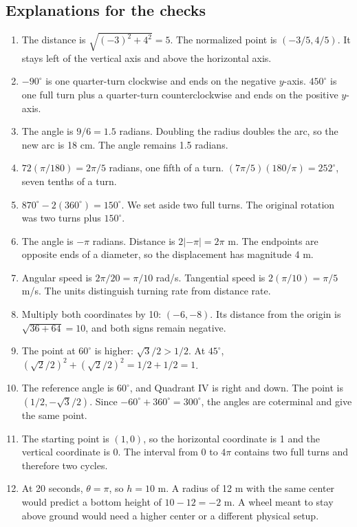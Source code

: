 \subsection{Explanations for the checks}
\begin{enumerate}
\item The distance is \(\sqrt{(-3)^2+4^2}=5\). The normalized point is \((-3/5,4/5)\). It stays left of the vertical axis and above the horizontal axis.
\item \(-90^\circ\) is one quarter-turn clockwise and ends on the negative \(y\)-axis. \(450^\circ\) is one full turn plus a quarter-turn counterclockwise and ends on the positive \(y\)-axis.
\item The angle is \(9/6=1.5\) radians. Doubling the radius doubles the arc, so the new arc is 18 cm. The angle remains 1.5 radians.
\item \(72(\pi/180)=2\pi/5\) radians, one fifth of a turn. \((7\pi/5)(180/\pi)=252^\circ\), seven tenths of a turn.
\item \(870^\circ-2(360^\circ)=150^\circ\). We set aside two full turns. The original rotation was two turns plus \(150^\circ\).
\item The angle is \(-\pi\) radians. Distance is \(2|{-\pi}|=2\pi\) m. The endpoints are opposite ends of a diameter, so the displacement has magnitude 4 m.
\item Angular speed is \(2\pi/20=\pi/10\) rad/s. Tangential speed is \(2(\pi/10)=\pi/5\) m/s. The units distinguish turning rate from distance rate.
\item Multiply both coordinates by 10: \((-6,-8)\). Its distance from the origin is \(\sqrt{36+64}=10\), and both signs remain negative.
\item The point at \(60^\circ\) is higher: \(\sqrt3/2>1/2\). At \(45^\circ\), \((\sqrt2/2)^2+(\sqrt2/2)^2=1/2+1/2=1\).
\item The reference angle is \(60^\circ\), and Quadrant IV is right and down. The point is \((1/2,-\sqrt3/2)\). Since \(-60^\circ+360^\circ=300^\circ\), the angles are coterminal and give the same point.
\item The starting point is \((1,0)\), so the horizontal coordinate is 1 and the vertical coordinate is 0. The interval from 0 to \(4\pi\) contains two full turns and therefore two cycles.
\item At 20 seconds, \(\theta=\pi\), so \(h=10\) m. A radius of 12 m with the same center would predict a bottom height of \(10-12=-2\) m. A wheel meant to stay above ground would need a higher center or a different physical setup.
\end{enumerate}

